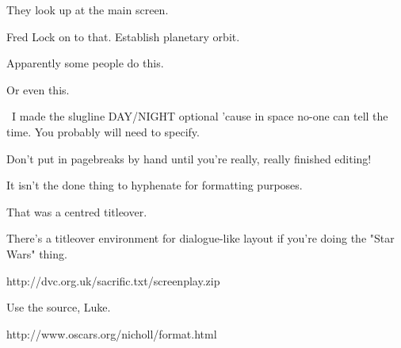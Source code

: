 \documentclass{screenplay}[2006/11/15]
\begin{document}
They look up at the main screen.

\begin{dialogue}{Fred}
Lock on to that.
Establish planetary orbit.
\end{dialogue}

Apparently some people do this.

\intercut
{}
Or even this.


\pov\ I made the slugline DAY/NIGHT optional 'cause in space no-one can
tell the time.  You probably will need to specify.

Don't put in pagebreaks by hand until you're really, really
finished editing!

It isn't the done thing to hyphenate for formatting purposes.

That was a centred titleover.
\begin{titleover}There's a titleover environment for dialogue-like layout if you're
doing the "Star Wars" thing.\end{titleover}
http://dvc.org.uk/sacrific.txt/screenplay.zip

Use the source, Luke.


http://www.oscars.org/nicholl/format.html

\fadeout

\theend
\end{document}
